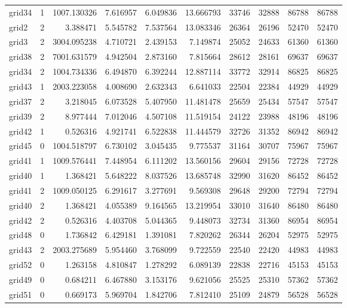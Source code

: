 \begin{longtable}{|l|r|r|r|r|r|r|r|r|r|}
grid34 & 1 & 1007.130326 & 7.616957 & 6.049836 & 13.666793 & 33746 & 32888 & 86788 & 86788 \\
grid2 & 2 & 3.388471 & 5.545782 & 7.537564 & 13.083346 & 26364 & 26196 & 52470 & 52470 \\
grid3 & 2 & 3004.095238 & 4.710721 & 2.439153 & 7.149874 & 25052 & 24633 & 61360 & 61360 \\
grid38 & 2 & 7001.631579 & 4.942504 & 2.873160 & 7.815664 & 28612 & 28161 & 69637 & 69637 \\
grid34 & 2 & 1004.734336 & 6.494870 & 6.392244 & 12.887114 & 33772 & 32914 & 86825 & 86825 \\
grid43 & 1 & 2003.223058 & 4.008690 & 2.632343 & 6.641033 & 22504 & 22384 & 44929 & 44929 \\
grid37 & 2 & 3.218045 & 6.073528 & 5.407950 & 11.481478 & 25659 & 25434 & 57547 & 57547 \\
grid39 & 2 & 8.977444 & 7.012046 & 4.507108 & 11.519154 & 24122 & 23988 & 48196 & 48196 \\
grid42 & 1 & 0.526316 & 4.921741 & 6.522838 & 11.444579 & 32726 & 31352 & 86942 & 86942 \\
grid45 & 0 & 1004.518797 & 6.730102 & 3.045435 & 9.775537 & 31164 & 30707 & 75967 & 75967 \\
grid41 & 1 & 1009.576441 & 7.448954 & 6.111202 & 13.560156 & 29604 & 29156 & 72728 & 72728 \\
grid40 & 1 & 1.368421 & 5.648222 & 8.037526 & 13.685748 & 32990 & 31620 & 86452 & 86452 \\
grid41 & 2 & 1009.050125 & 6.291617 & 3.277691 & 9.569308 & 29648 & 29200 & 72794 & 72794 \\
grid40 & 2 & 1.368421 & 4.055389 & 9.164565 & 13.219954 & 33010 & 31640 & 86480 & 86480 \\
grid42 & 2 & 0.526316 & 4.403708 & 5.044365 & 9.448073 & 32734 & 31360 & 86954 & 86954 \\
grid48 & 0 & 1.736842 & 6.429181 & 1.391081 & 7.820262 & 26344 & 26204 & 52975 & 52975 \\
grid43 & 2 & 2003.275689 & 5.954460 & 3.768099 & 9.722559 & 22540 & 22420 & 44983 & 44983 \\
grid52 & 0 & 1.263158 & 4.810847 & 1.278292 & 6.089139 & 22838 & 22716 & 45153 & 45153 \\
grid49 & 0 & 0.684211 & 6.467880 & 3.153176 & 9.621056 & 25525 & 25310 & 57362 & 57362 \\
grid51 & 0 & 0.669173 & 5.969704 & 1.842706 & 7.812410 & 25109 & 24879 & 56528 & 56528 \\

\end{longtable}
